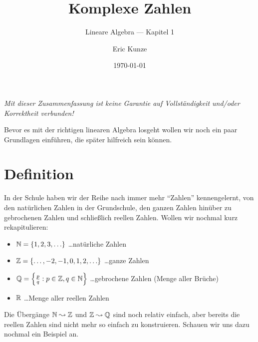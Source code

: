\documentclass[ngerman, a4paper, 12pt]{scrartcl}
\theoremstyle{plain}
\theoremstyle{proofstyle}
\begin{document}
	
	\title{Komplexe Zahlen}
	\subtitle{Lineare Algebra --- Kapitel 1}
	\author{Eric Kunze}
	\date{\today}
	
	
	\maketitle
	
	{ \footnotesize \doclicenseThis }
	
	\begin{center}
		\small \slshape Mit dieser Zusammenfassung ist keine Garantie auf Vollständigkeit und/oder Korrektheit verbunden!
	\end{center}

	
	Bevor es mit der richtigen linearen Algebra losgeht wollen wir noch ein paar Grundlagen einführen, die später hilfreich sein können. 
	

\section{Definition}

	In der Schule haben wir der Reihe nach immer mehr \enquote{Zahlen} kennengelernt, von den natürlichen Zahlen in der Grundschule, den ganzen Zahlen hinüber zu gebrochenen Zahlen und schließlich reellen Zahlen. Wollen wir nochmal kurz rekapitulieren:
	\begin{itemize}
		\item $\N = \menge{1,2,3, \dots}$ \dots natürliche Zahlen
		\item $\Z = \menge{\dots, -2, -1, 0, 1, 2, \dots}$ \dots ganze Zahlen
		\item $\mathbb{Q} = \left\{ \frac{p}{q} : p \in \mathbb{Z}, q \in \mathbb{N} \right\}$ \dots gebrochene Zahlen (Menge aller Brüche) 
		\item $\mathbb{R}$ \dots Menge aller reellen Zahlen
	\end{itemize}
	Die Übergänge $\mathbb{N} \leadsto \mathbb{Z}$ und $\mathbb{Z} \leadsto \mathbb{Q}$ sind noch relativ einfach, aber bereits die reellen Zahlen sind nicht mehr so einfach zu konstruieren. Schauen wir uns dazu nochmal ein Beispiel an.
	
\end{document}
